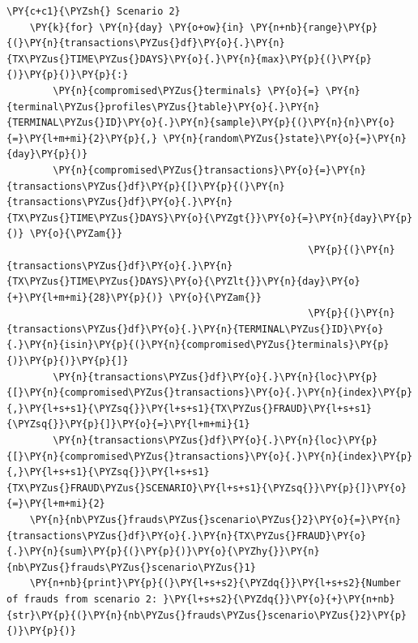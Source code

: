 \begin{tcolorbox}[breakable, size=fbox, boxrule=1pt, pad at break*=1mm,colback=cellbackground, colframe=cellborder]
\begin{Verbatim}[commandchars=\\\{\}]
    \PY{c+c1}{\PYZsh{} Scenario 2}
    \PY{k}{for} \PY{n}{day} \PY{o+ow}{in} \PY{n+nb}{range}\PY{p}{(}\PY{n}{transactions\PYZus{}df}\PY{o}{.}\PY{n}{TX\PYZus{}TIME\PYZus{}DAYS}\PY{o}{.}\PY{n}{max}\PY{p}{(}\PY{p}{)}\PY{p}{)}\PY{p}{:}
        \PY{n}{compromised\PYZus{}terminals} \PY{o}{=} \PY{n}{terminal\PYZus{}profiles\PYZus{}table}\PY{o}{.}\PY{n}{TERMINAL\PYZus{}ID}\PY{o}{.}\PY{n}{sample}\PY{p}{(}\PY{n}{n}\PY{o}{=}\PY{l+m+mi}{2}\PY{p}{,} \PY{n}{random\PYZus{}state}\PY{o}{=}\PY{n}{day}\PY{p}{)}
        \PY{n}{compromised\PYZus{}transactions}\PY{o}{=}\PY{n}{transactions\PYZus{}df}\PY{p}{[}\PY{p}{(}\PY{n}{transactions\PYZus{}df}\PY{o}{.}\PY{n}{TX\PYZus{}TIME\PYZus{}DAYS}\PY{o}{\PYZgt{}}\PY{o}{=}\PY{n}{day}\PY{p}{)} \PY{o}{\PYZam{}}
                                                    \PY{p}{(}\PY{n}{transactions\PYZus{}df}\PY{o}{.}\PY{n}{TX\PYZus{}TIME\PYZus{}DAYS}\PY{o}{\PYZlt{}}\PY{n}{day}\PY{o}{+}\PY{l+m+mi}{28}\PY{p}{)} \PY{o}{\PYZam{}}
                                                    \PY{p}{(}\PY{n}{transactions\PYZus{}df}\PY{o}{.}\PY{n}{TERMINAL\PYZus{}ID}\PY{o}{.}\PY{n}{isin}\PY{p}{(}\PY{n}{compromised\PYZus{}terminals}\PY{p}{)}\PY{p}{)}\PY{p}{]}
        \PY{n}{transactions\PYZus{}df}\PY{o}{.}\PY{n}{loc}\PY{p}{[}\PY{n}{compromised\PYZus{}transactions}\PY{o}{.}\PY{n}{index}\PY{p}{,}\PY{l+s+s1}{\PYZsq{}}\PY{l+s+s1}{TX\PYZus{}FRAUD}\PY{l+s+s1}{\PYZsq{}}\PY{p}{]}\PY{o}{=}\PY{l+m+mi}{1}
        \PY{n}{transactions\PYZus{}df}\PY{o}{.}\PY{n}{loc}\PY{p}{[}\PY{n}{compromised\PYZus{}transactions}\PY{o}{.}\PY{n}{index}\PY{p}{,}\PY{l+s+s1}{\PYZsq{}}\PY{l+s+s1}{TX\PYZus{}FRAUD\PYZus{}SCENARIO}\PY{l+s+s1}{\PYZsq{}}\PY{p}{]}\PY{o}{=}\PY{l+m+mi}{2}
    \PY{n}{nb\PYZus{}frauds\PYZus{}scenario\PYZus{}2}\PY{o}{=}\PY{n}{transactions\PYZus{}df}\PY{o}{.}\PY{n}{TX\PYZus{}FRAUD}\PY{o}{.}\PY{n}{sum}\PY{p}{(}\PY{p}{)}\PY{o}{\PYZhy{}}\PY{n}{nb\PYZus{}frauds\PYZus{}scenario\PYZus{}1}
    \PY{n+nb}{print}\PY{p}{(}\PY{l+s+s2}{\PYZdq{}}\PY{l+s+s2}{Number of frauds from scenario 2: }\PY{l+s+s2}{\PYZdq{}}\PY{o}{+}\PY{n+nb}{str}\PY{p}{(}\PY{n}{nb\PYZus{}frauds\PYZus{}scenario\PYZus{}2}\PY{p}{)}\PY{p}{)}


\end{Verbatim}
\end{tcolorbox}
